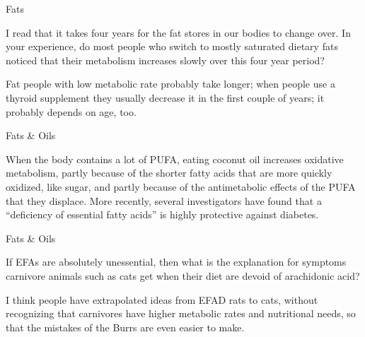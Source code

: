 \documentclass[11pt,oneside,openany,extrafontsizes]{memoir}
\begin{document}
\begin{qaexchange}{Fats}

    \begin{question}
        I read that it takes four years for the fat stores in our bodies to change over. In your experience, do most people who switch to mostly saturated dietary fats noticed that their metabolism increases slowly over this four year period?
    \end{question}

    \begin{answer}
      Fat people with low metabolic rate probably take longer; when people use a thyroid supplement they usually decrease it in the first couple of years; it probably depends on age, too.
    \end{answer}
\end{qaexchange}

\begin{standalonequote}{Fats \& Oils}

    \begin{answer}
      When the body contains a lot of PUFA, eating coconut oil increases oxidative metabolism, partly because of the shorter fatty acids that are more quickly oxidized, like sugar, and partly because of the antimetabolic effects of the PUFA that they displace. More recently, several investigators have found that a \enquote{deficiency of essential fatty acids} is highly protective against diabetes.
    \end{answer}
\end{standalonequote}

\begin{qaexchange}{Fats \& Oils}

    \begin{question}
        If EFAs are absolutely unessential, then what is the explanation for symptoms carnivore animals such as cats get when their diet are devoid of arachidonic acid?
    \end{question}

    \begin{answer}
      I think people have extrapolated ideas from EFAD rats to cats, without recognizing that carnivores have higher metabolic rates and nutritional needs, so that the mistakes of the Burrs are even easier to make.
    \end{answer}
\end{qaexchange}
\end{document}
